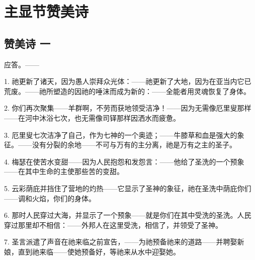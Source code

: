 
\chapter{主显节赞美诗}



\section{赞美诗 一}

应答。——\par

1. 祂更新了诸天，因为愚人崇拜众光体：——\newline{}祂更新了大地，因为在亚当内它已荒废。——\newline{}祂所塑造的因祂的唾沫而成为新的：——\newline{}全能者用灵魂恢复了身体。\par

2. 你们再次聚集——羊群啊，不劳而获地领受洁净！——因为无需像厄里叟那样——在河中沐浴七次，也无需像司铎那样因洒水而疲惫。\par

3. 厄里叟七次洁净了自己，作为七神的一个奥迹；——牛膝草和血是强大的象征。——没有分裂的余地——不可与万有的主分离，祂是万有之主的圣子。\par

4. 梅瑟在使苦水变甜——因为人民抱怨和发怨言：——他给了圣洗的一个预象——在其中生命的主使那些苦的变甜。\par

5. 云彩荫庇并挡住了营地的灼热——它显示了圣神的象征，祂在圣洗中荫庇你们——调和火焰，你们的身体。\par

6. 那时人民穿过大海，并显示了一个预象——就是你们在其中受洗的圣洗。人民穿过那里却不相信：——外邦人在这里受洗，相信了，并领受了圣神。\par

7. 圣言派遣了声音在祂来临之前宣告，——为祂预备祂来的道路——并聘娶新娘，直到祂来临——使她预备好，等祂来从水中迎娶她。\par


